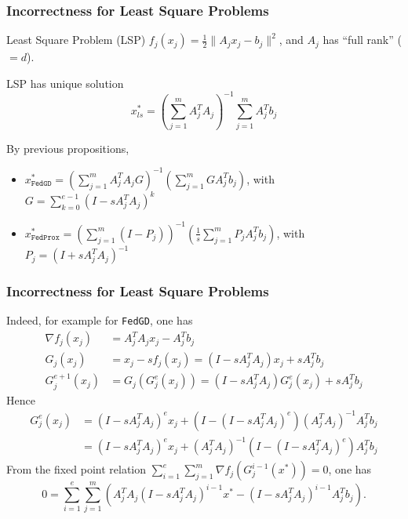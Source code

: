
\begin{frame}
\frametitle{Incorrectness for Least Square Problems}

\begin{block}{Least Square Problem (LSP)}
$f_j(x_j) = \frac12 \lVert A_jx_j-b_j \rVert^2$, and $A_j$ has ``full rank'' ($=d$).
\end{block}

LSP has unique solution
{\smaller
$$x^*_{ls} = \left( \sum_{j=1}^m A_j^TA_j \right)^{-1} \sum_{j=1}^m A_j^Tb_j$$
}

\pause

By previous propositions,
\begin{itemize}
    \item {\smaller$x^*_{\texttt{FedGD}} = \left( \sum\limits_{j=1}^m A_j^TA_j G \right)^{-1}\left( \sum\limits_{j=1}^m GA_j^Tb_j \right)$, with $G = \sum\limits_{k=0}^{e-1}(I-sA_j^TA_j)^k$}
    \item {\smaller$x^*_{\texttt{FedProx}} = \left( \sum\limits_{j=1}^m \left( I - P_j \right) \right)^{-1}\left( \frac{1}{s}\sum\limits_{j=1}^m P_jA_j^Tb_j \right)$, with $P_j = (I+sA_j^TA_j)^{-1}$}
\end{itemize}

\end{frame}


\begin{frame}
\frametitle{Incorrectness for Least Square Problems}

Indeed, for example for \texttt{FedGD}, one has
\begin{align*}
\nabla f_j(x_j) & = A_j^TA_jx_j - A^T_jb_j \\
G_j(x_j) & = x_j - s f_j(x_j) =  (I - sA_j^TA_j)x_j + sA^T_jb_j \\
G_j^{e+1}(x_j) & = G_j(G_j^e(x_j)) = (I - sA_j^TA_j)G_j^e(x_j) + sA^T_jb_j
\end{align*}
Hence
\begin{align*}
G_j^e(x_j) & = (I - sA_j^TA_j)^e x_j + (I-(I - sA_j^TA_j)^e) (A_j^TA_j)^{-1} A_j^T b_j \\
& = (I - sA_j^TA_j)^e x_j + (A_j^TA_j)^{-1} (I-(I - sA_j^TA_j)^e) A_j^T b_j
\end{align*}
From the fixed point relation {\smaller$\sum\limits_{i=1}^e\sum\limits_{j=1}^m \nabla f_j(G_j^{i-1}(x^*)) = 0$}, one has
$$0 = \sum\limits_{i=1}^e \sum\limits_{j=1}^m \left( A_j^TA_j (I - sA_j^TA_j)^{i-1} x^* - (I - sA_j^TA_j)^{i-1}A_j^Tb_j \right).$$

\end{frame}

